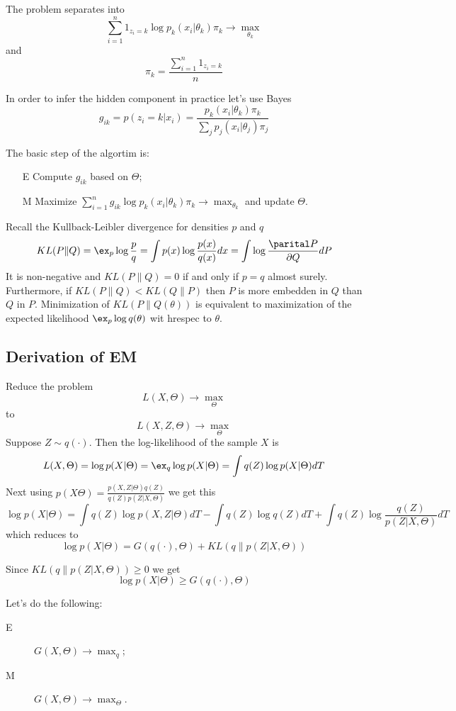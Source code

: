 \documentclass[a4paper]{article}
\begin{document}
The problem separates into
\[ \sum_{i=1}^n 1_{z_i=k} \log p_k(x_i|\theta_k) \pi_k \to \max_{\theta_k} \]
and 
\[ \pi_k = \frac{\sum_{i=1}^n 1_{z_i=k}}{n} \]

In order to infer the hidden component in practice let's use Bayes
\[
g_{ik}
= p(z_i = k| x_i)
= \frac{ p_k(x_i|\theta_k) \pi_k }{\sum_j p_j(x_i|\theta_j) \pi_j}
\]

The basic step of the algortim is:
\begin{itemize}
	\item[E] Compute $g_{ik}$ based on $\Theta$;
	\item[M] Maximize $\sum_{i=1}^n g_{ik} \log p_k(x_i|\theta_k) \pi_k \to \max_{\theta_k}$
	and update $\Theta$.
\end{itemize}

Recall the Kullback-Leibler divergence for densities $p$ and $q$
\[
KL(P\|Q)
= \ex_p \log \frac{p}{q}
= \int p(x) \log \frac{p(x)}{q(x)} dx
= \int \log \frac{\parital P}{\partial Q} dP
\]
It is non-negative and $KL(P\|Q) = 0$ if and only if $p = q$ almost surely.
Furthermore, if $KL(P\|Q)< KL(Q\|P)$ then $P$ is more embedden in $Q$ than $Q$ in $P$.
Minimization of $KL(P\|Q(\theta))$ is equivalent to maximization of the expected
likelihood $\ex_p \log q(\theta)$ wit hrespec to $\theta$.


\subsection{Derivation of EM} %
\label{sub:derivation_of_em}

Reduce the problem 
\[L(X,\Theta) \to \max_\Theta\]
to
\[L(X,Z,\Theta) \to \max_\Theta\]
Suppose $Z\sim q(\cdot)$. Then the log-likelihood of the sample $X$ is
\[
L(X,\Theta)
= \log p(X|\Theta)
= \ex_q \log p(X|\Theta)
= \int q(Z) \log p(X|\Theta) dT
\]
Next using $p(X \Theta) = \frac{p(X,Z|\Theta) q(Z)}{ q(Z) p(Z|X,\Theta)}$ we get this
\[
\log p(X|\Theta)
= \int q(Z) \log p(X,Z|\Theta) dT - \int q(Z) \log q(Z) dT
+ \int q(Z) \log \frac{q(Z)}{p(Z|X,\Theta)} dT
\]
which reduces to
\[ \log p(X|\Theta) = G(q(\cdot),\Theta) + KL(q\|p(Z|X,\Theta)) \]

Since $KL(q\|p(Z|X,\Theta)) \geq 0$ we get
\[
\log p(X|\Theta) \geq G(q(\cdot),\Theta)
\]

Let's do the following: \begin{description}
	\item[E] $G(X,\Theta) \to \max_q$;
	\item[M] $G(X,\Theta) \to \max_{\Theta}$.
\end{description}
\end{document}
